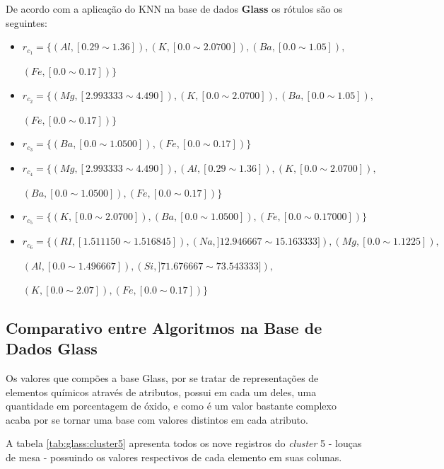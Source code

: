 De acordo com a aplicação do KNN na base de dados \textbf{Glass} os rótulos são os seguintes:
\begin{itemize}[noitemsep]
 \item ${r_{c_1}=\{(Al,[ 0.29 \sim 1.36 ] ),(K,[ 0.0 \sim  2.0700 ] ), (Ba,[ 0.0 \sim 1.05 ] ),}$
 
 ${ (Fe,[ 0.0 \sim 0.17] )  \} }$
 \item ${r_{c_2}=\{(Mg, [ 2.993333 \sim  4.490]),(K,[ 0.0 \sim  2.0700 ] ), (Ba,[ 0.0 \sim 1.05 ] ),}$
 
 ${ (Fe,[ 0.0 \sim 0.17] )  \} }$
 \item ${r_{c_3}=\{ (Ba,[ 0.0 \sim 1.0500 ] ),(Fe,[ 0.0 \sim 0.17] )  \} }$
 \item ${r_{c_4}=\{(Mg, [ 2.993333 \sim  4.490]), (Al,[ 0.29 \sim 1.36 ] ),(K,[ 0.0 \sim  2.0700 ] ),}$
 
 ${ (Ba,[ 0.0 \sim 1.0500 ] ), (Fe,[ 0.0 \sim 0.17] )  \} }$
 \item ${r_{c_5}=\{ (K,[ 0.0 \sim  2.0700 ] ), (Ba,[ 0.0 \sim 1.0500 ] ), (Fe,[ 0.0 \sim 0.17000] ) \} }$
 \item ${r_{c_6}=\{ (RI,[ 1.511150 \sim  1.516845  ] ),(Na,]12.946667 \sim 15.163333 ] ),  (Mg,[ 0.0 \sim  1.1225  ] ), }$
 
 ${ (Al,[0.0 \sim  1.496667 ] ), (Si,] 71.676667 \sim  73.543333 ] ),  }$
 
 ${ (K,[ 0.0 \sim 2.07] ),(Fe,[ 0.0 \sim 0.17 ] ) \} }$
\end{itemize}


\subsection{Comparativo entre Algoritmos na Base de Dados Glass} \label{cap:resultados:ssec:compalgoritmos:glass}

Os valores que compões a base Glass, por se tratar de representações de elementos químicos através de atributos, possui  em cada um deles, uma quantidade em porcentagem de óxido, e como é um valor bastante complexo acaba por se tornar uma base com valores distintos em cada atributo.

A tabela \ref{tab:glass:cluster5} apresenta todos os nove registros do \textit{cluster} 5 - louças de mesa - possuindo os valores respectivos de cada elemento em suas colunas.


